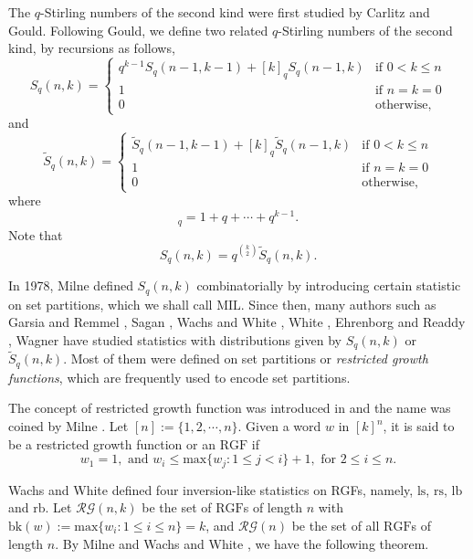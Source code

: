 \documentclass[12pt]{amsart}
\numberwithin{equation}{section}
\theoremstyle{plain}
\theoremstyle{definition}
\def\MIL{\mathrm{MIL}}
\def\bk{\mathrm{bk}}
\def\RGF{\mathrm{RGF}}
\def\lb{\mathrm{lb}}
\def\ls{\mathrm{ls}}
\def\rb{\mathrm{rb}}
\def\rs{\mathrm{rs}}
\def\max{\mathrm{max}}
\def\RG{\mathcal{RG}}
\begin{document}
The $q$-Stirling numbers of the second kind were first studied by Carlitz
\cite{Ca1,Ca2} and Gould\cite{Go}. Following Gould\cite{Go}, we define two related $q$-Stirling numbers of the second kind, by recursions as follows,
\begin{equation}\label{def-sq1}
S_q(n,k) = \left\{
  \begin{array}{ll}
q^{k-1}S_q(n-1,k-1)+[k]_q S_q(n-1,k) & \mbox{if $0 < k \leq n$}\\[6pt]
1 & \mbox{if $n=k=0$}\\[6pt]
0  & \mbox{otherwise,}
 \end{array} \right.
\end{equation}
and
\begin{equation}\label{def-sq2}
\widetilde{S}_q(n,k) = \left\{
  \begin{array}{ll}
\widetilde{S}_q(n-1,k-1)+[k]_q \widetilde{S}_q(n-1,k) & \mbox{if $0 < k \leq n$}\\[6pt]
1 & \mbox{if $n=k=0$}\\[6pt]
0  & \mbox{otherwise,}
 \end{array} \right.
\end{equation}
where
\begin{equation*}
  [k]_q=1+q+\cdots+q^{k-1}.
\end{equation*}
Note that
\begin{equation*}
  S_q(n,k)=q^{\binom{k}{2}} \widetilde{S}_q(n,k).
\end{equation*}

In 1978, Milne \cite{Mi} defined $S_q(n,k)$ combinatorially by introducing
certain statistic on set partitions, which we shall call $\MIL$.
Since then, many authors such as Garsia and Remmel \cite{GR}, Sagan \cite{Sa}, Wachs and White \cite{WW}, White \cite{Wh}, Ehrenborg and Readdy \cite{ER}, Wagner \cite{Wa} have studied statistics with distributions given by $S_q(n,k)$ or $\widetilde{S}_q(n,k)$. Most of them were defined on set partitions or \emph{restricted growth functions}, which are frequently used to encode set partitions.

The concept of restricted growth function was introduced in \cite{Hu,Wi} and the name was coined by Milne \cite{Mil}. Let $[n]:=\{1,2, \cdots, n\}$. Given a word $w$ in $[k]^n$, it is said to be a restricted growth function or an $\RGF$ if
$$w_1=1, \text{ and } w_i \leq \max\{w_j: 1 \leq j <i\} +1, \text{ for } 2\le i\le n.$$


Wachs and White \cite{WW} defined four inversion-like statistics on RGFs, namely, $\ls$, $\rs$, $\lb$ and $\rb$. Let $\RG(n,k)$ be the set of $\RGF$s of length $n$ with $\bk(w):=\max\{w_i:1\le i\le n\}=k$, and $\RG(n)$ be the set of all $\RGF$s of length $n$. By Milne\cite{Mi} and Wachs and White \cite{WW}, we have the following theorem.
\end{document}

